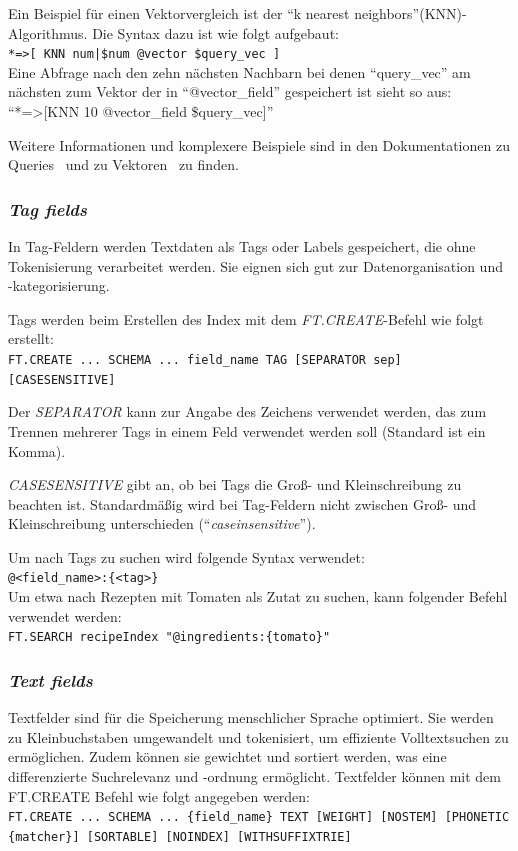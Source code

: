 Ein Beispiel für einen Vektorvergleich ist der \enquote{k nearest neighbors}(KNN)-Algorithmus. Die Syntax dazu ist wie folgt aufgebaut:\\
\texttt{*=>[ KNN {num|\$num} @vector \$query\_vec ]}\\
Eine Abfrage nach den zehn nächsten Nachbarn bei denen \enquote{query\_vec} am nächsten zum Vektor der in \enquote{@vector\_field} gespeichert ist sieht so aus:\\
\enquote{*=>[KNN 10 @vector\_field \$query\_vec]}

Weitere Informationen und komplexere Beispiele sind in den Dokumentationen zu Queries~\cite{redis_ltd_query_nodate} und zu Vektoren~\cite{redis_ltd_vectors_nodate} zu finden.


\subsubsection{\emph{Tag fields}} In Tag-Feldern werden Textdaten als Tags oder Labels gespeichert, die ohne Tokenisierung verarbeitet werden. Sie eignen sich gut zur Datenorganisation und -kategorisierung.

Tags werden beim Erstellen des Index mit dem \emph{FT.CREATE}-Befehl wie folgt erstellt:\\
\texttt{FT.CREATE ... SCHEMA ... {field\_name} TAG [SEPARATOR {sep}] [CASESENSITIVE]}

Der \emph{SEPARATOR} kann zur Angabe des Zeichens verwendet werden, das zum Trennen mehrerer Tags in einem Feld verwendet werden soll (Standard ist ein Komma).

\emph{CASESENSITIVE} gibt an, ob bei Tags die Groß- und Kleinschreibung zu beachten ist. Standardmäßig wird bei Tag-Feldern nicht zwischen Groß- und Kleinschreibung unterschieden (\enquote{\emph{caseinsensitive}}).

Um nach Tags zu suchen wird folgende Syntax verwendet:\\
\texttt{@<field\_name>:\{<tag>\}}\\
Um etwa nach Rezepten mit Tomaten als Zutat zu suchen, kann folgender Befehl verwendet werden:\\
\texttt{FT.SEARCH recipeIndex "@ingredients:\{tomato\}"}


\subsubsection{{\emph{Text fields}}}
Textfelder sind für die Speicherung menschlicher Sprache optimiert. Sie werden zu Kleinbuchstaben umgewandelt und tokenisiert, um effiziente Volltextsuchen zu ermöglichen. Zudem können sie gewichtet und sortiert werden, was eine differenzierte Suchrelevanz und -ordnung ermöglicht.
Textfelder können mit dem FT.CREATE Befehl wie folgt angegeben werden:\\
\texttt{FT.CREATE ... SCHEMA ... \{field\_name\} TEXT [WEIGHT] [NOSTEM] [PHONETIC \{matcher\}] [SORTABLE] [NOINDEX] [WITHSUFFIXTRIE]}

